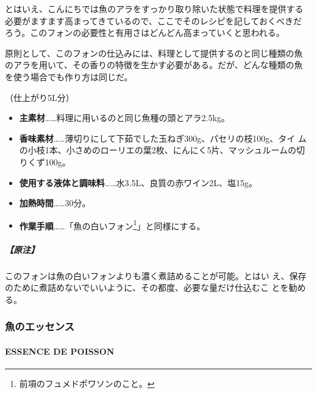 \documentclass[twoside,12Q,b5j]{escoffierltjsbook}
\newenvironment{recette}{\begin{small}\begin{spacing}{1}\begin{multicols}{2}}{\end{multicols}\end{spacing}\end{small}}
\begin{document}
\begin{recette}
とはいえ、こんにちでは魚のアラをすっかり取り除いた状態で料理を提供する
必要がますます高まってきているので、ここでそのレシピを記しておくべきだ
ろう。このフォンの必要性と有用さはどんどん高まっていくと思われる。

原則として、このフォンの仕込みには、料理として提供するのと同じ種類の魚
のアラを用いて、その香りの特徴を生かす必要がある。だが、どんな種類の魚
を使う場合でも作り方は同じだ。

（仕上がり5L分）

\begin{itemize}
\item
  \textbf{主素材}\ldots{}\ldots{}料理に用いるのと同じ魚種の頭とアラ2.5kg。
\item
  \textbf{香味素材}\ldots{}\ldots{}薄切りにして下茹でした玉ねぎ300g、パセリの枝100g、タイ
  ムの小枝1本、小さめのローリエの葉2枚、にんにく5片、マッシュルームの切
  りくず100g。
\item
  \textbf{使用する液体と調味料}\ldots{}\ldots{}水3.5L、良質の赤ワイン2L、塩15g。
\item
  \textbf{加熱時間}\ldots{}\ldots{}30分。
\item
  \textbf{作業手順}\ldots{}\ldots{}「魚の白いフォン\footnote{前項のフュメドポワソンのこと。}」と同様にする。
\end{itemize}

\subparagraph{【原注】}\label{ux539fux6ce8-3}

このフォンは魚の白いフォンよりも濃く煮詰めることが可能。とはい
え、保存のために煮詰めないでいいように、その都度、必要な量だけ仕込むこ
とを勧める。

\vspace*{1.7\zw}

\subsubsection{魚のエッセンス}\label{ux9b5aux306eux30a8ux30c3ux30bbux30f3ux30b9}

\paragraph{ESSENCE DE POISSON}\label{essence-de-poisson}



\end{recette}
\end{document}
